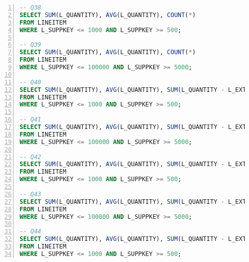 \begin{lstlisting}[language=sql,numbers=left,xleftmargin=2em,multicols=2,basicstyle=\ttfamily\tiny]
-- Q38
SELECT SUM(L_QUANTITY), AVG(L_QUANTITY), COUNT(*)
FROM LINEITEM
WHERE L_SUPPKEY <= 1000 AND L_SUPPKEY >= 500;

-- Q39
SELECT SUM(L_QUANTITY), AVG(L_QUANTITY), COUNT(*)
FROM LINEITEM
WHERE L_SUPPKEY <= 100000 AND L_SUPPKEY >= 5000;

-- Q40
SELECT SUM(L_QUANTITY), AVG(L_QUANTITY), SUM(L_QUANTITY - L_EXTENDEDPRICE), SUM(L_QUANTITY * L_EXTENDEDPRICE - 1), COUNT(*)
FROM LINEITEM
WHERE L_SUPPKEY <= 1000 AND L_SUPPKEY >= 500;

-- Q41
SELECT SUM(L_QUANTITY), AVG(L_QUANTITY), SUM(L_QUANTITY - L_EXTENDEDPRICE), SUM(L_QUANTITY * L_EXTENDEDPRICE - 1), COUNT(*)
FROM LINEITEM
WHERE L_SUPPKEY <= 100000 AND L_SUPPKEY >= 5000;

-- Q42
SELECT SUM(L_QUANTITY), AVG(L_QUANTITY), SUM(L_QUANTITY - L_EXTENDEDPRICE), SUM(L_QUANTITY * L_EXTENDEDPRICE - 1), AVG(L_DISCOUNT * (L_TAX +1)), AVG(L_QUANTITY / (L_TAX +1)), COUNT(*)
FROM LINEITEM
WHERE L_SUPPKEY <= 1000 AND L_SUPPKEY >= 500;

-- Q43
SELECT SUM(L_QUANTITY), AVG(L_QUANTITY), SUM(L_QUANTITY - L_EXTENDEDPRICE), SUM(L_QUANTITY * L_EXTENDEDPRICE - 1), AVG(L_DISCOUNT * (L_TAX +1)), AVG(L_QUANTITY / (L_TAX +1)), COUNT(*)
FROM LINEITEM
WHERE L_SUPPKEY <= 100000 AND L_SUPPKEY >= 5000;

-- Q44
SELECT SUM(L_QUANTITY), AVG(L_QUANTITY), SUM(L_QUANTITY - L_EXTENDEDPRICE), SUM(L_QUANTITY * L_EXTENDEDPRICE - 1), AVG(L_DISCOUNT * (L_TAX +1)), AVG(L_QUANTITY / (L_TAX +1)), SUM(L_TAX)/SUM(L_EXTENDEDPRICE), SUM(L_QUANTITY * 0.5), AVG(L_QUANTITY * 0.2), COUNT(*)
FROM LINEITEM
WHERE L_SUPPKEY <= 1000 AND L_SUPPKEY >= 500;
\end{lstlisting}
